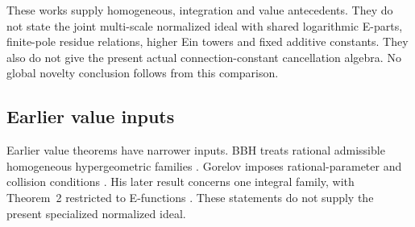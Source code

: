 These works supply homogeneous, integration and value antecedents.
They do not state the joint multi-scale normalized ideal with shared logarithmic E-parts,
finite-pole residue relations, higher Ein towers and fixed additive constants.
They also do not give the present actual connection-constant cancellation algebra.
No global novelty conclusion follows from this comparison.

\subsection*{Earlier value inputs}
Earlier value theorems have narrower inputs.
BBH treats rational admissible homogeneous hypergeometric families
\cite[Corollary~4.6, pp.~300--301]{BBH1988}.
Gorelov imposes rational-parameter and collision conditions
\cite[Theorem~3, pp.~664--665]{Gorelov2016}.
His later result concerns one integral family, with Theorem~2 restricted to E-functions
\cite[Theorem~2, p.~385; Conclusion~1, p.~390]{Gorelov2025}.
These statements do not supply the present specialized normalized ideal.
